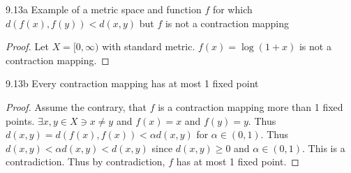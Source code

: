 \documentclass{article}
\begin{document}
\begin{PROB}{9.13a}\label{Problem 9.13a.}
    Example of a metric space and function $f$ for which $d(f(x), f(y)) < d(x, y)$ but $f$ is not a contraction mapping   
\end{PROB}
\begin{proof}
    Let $X = [0, \infty)$ with standard metric. $f(x) = \log(1 + x)$ is not a contraction mapping.  
\end{proof}
\begin{claim}{9.13b}\label{Claim 9.13b.}
    Every contraction mapping has at most 1 fixed point
\end{claim}
\begin{proof}
    Assume the contrary, that $f$ is a contraction mapping more than 1 fixed points. $\exists x, y \in X \ni x \neq y$ and $f(x) = x$ and $f(y) = y$. Thus $d(x, y) = d(f(x), f(x)) < \alpha d(x, y)$ for $\alpha \in (0, 1)$. Thus $d(x, y) < \alpha d(x, y) < d(x, y)$ since $d(x, y) \geq 0$ and $\alpha \in (0, 1)$. This is a contradiction. Thus by contradiction, $f$ has at most 1 fixed point.               
\end{proof}

\bigskip
\end{document}
